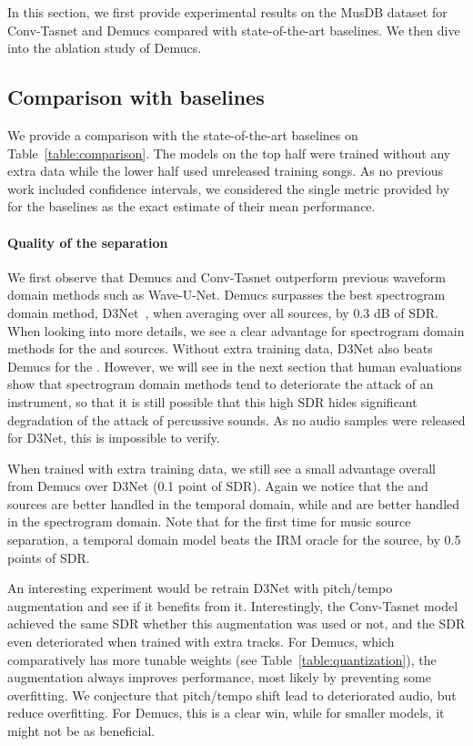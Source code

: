 In this section, we first provide experimental results on the MusDB dataset for Conv-Tasnet and Demucs compared with state-of-the-art baselines. We then dive into the ablation study of Demucs. 

\subsection{Comparison with baselines}

We provide a comparison with the state-of-the-art baselines on Table~\ref{table:comparison}. The models on the top half were trained without any extra data
while the lower half used unreleased training songs. As no previous work included confidence intervals, we considered the single metric provided by for the baselines as the exact estimate of their mean performance.


\paragraph{Quality of the separation}

We first observe that Demucs and Conv-Tasnet outperform previous waveform domain methods such as Wave-U-Net. Demucs surpasses the best spectrogram domain method, D3Net~\citep{takahashi2020d3net}, when averaging over all sources, by 0.3 dB of SDR.
When looking into more details, we see a clear advantage for spectrogram domain methods for the  and  sources. Without extra training data, D3Net also beats Demucs for the . However, we will see in the next section that human evaluations show that spectrogram domain methods tend to deteriorate the attack of an instrument, so that it is still possible that this high SDR hides significant degradation of the attack of percussive sounds. As no audio samples were released for D3Net, this is impossible to verify.

When trained with extra training data, we still see a small advantage overall from Demucs over D3Net (0.1 point of SDR). Again we notice that the  and  sources are better handled in the temporal domain, while  and  are better handled in the spectrogram domain.
Note that for the first time for music source separation, a temporal domain model beats the IRM oracle for the  source, by 0.5 points of SDR.

An interesting experiment would be retrain D3Net with pitch/tempo augmentation and see if it benefits from it. Interestingly, the Conv-Tasnet model achieved the same SDR whether this augmentation was used or not, and the SDR even deteriorated when trained with extra tracks. For Demucs, which comparatively has more tunable weights (see Table~\ref{table:quantization}), the augmentation always improves performance, most likely by preventing some overfitting. We conjecture that pitch/tempo shift lead to deteriorated audio, but reduce overfitting. For Demucs, this is a clear win, while for smaller models, it might not be as beneficial.

